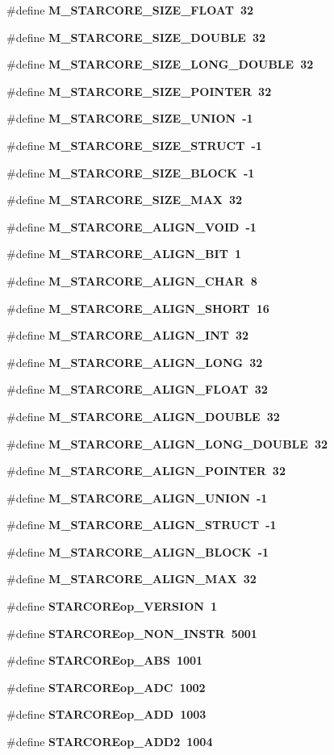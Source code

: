 \begin{CompactItemize}
\#define \bf{M\_\-STARCORE\_\-SIZE\_\-FLOAT}~32
\item 
\#define \bf{M\_\-STARCORE\_\-SIZE\_\-DOUBLE}~32
\item 
\#define \bf{M\_\-STARCORE\_\-SIZE\_\-LONG\_\-DOUBLE}~32
\item 
\#define \bf{M\_\-STARCORE\_\-SIZE\_\-POINTER}~32
\item 
\#define \bf{M\_\-STARCORE\_\-SIZE\_\-UNION}~-1
\item 
\#define \bf{M\_\-STARCORE\_\-SIZE\_\-STRUCT}~-1
\item 
\#define \bf{M\_\-STARCORE\_\-SIZE\_\-BLOCK}~-1
\item 
\#define \bf{M\_\-STARCORE\_\-SIZE\_\-MAX}~32
\item 
\#define \bf{M\_\-STARCORE\_\-ALIGN\_\-VOID}~-1
\item 
\#define \bf{M\_\-STARCORE\_\-ALIGN\_\-BIT}~1
\item 
\#define \bf{M\_\-STARCORE\_\-ALIGN\_\-CHAR}~8
\item 
\#define \bf{M\_\-STARCORE\_\-ALIGN\_\-SHORT}~16
\item 
\#define \bf{M\_\-STARCORE\_\-ALIGN\_\-INT}~32
\item 
\#define \bf{M\_\-STARCORE\_\-ALIGN\_\-LONG}~32
\item 
\#define \bf{M\_\-STARCORE\_\-ALIGN\_\-FLOAT}~32
\item 
\#define \bf{M\_\-STARCORE\_\-ALIGN\_\-DOUBLE}~32
\item 
\#define \bf{M\_\-STARCORE\_\-ALIGN\_\-LONG\_\-DOUBLE}~32
\item 
\#define \bf{M\_\-STARCORE\_\-ALIGN\_\-POINTER}~32
\item 
\#define \bf{M\_\-STARCORE\_\-ALIGN\_\-UNION}~-1
\item 
\#define \bf{M\_\-STARCORE\_\-ALIGN\_\-STRUCT}~-1
\item 
\#define \bf{M\_\-STARCORE\_\-ALIGN\_\-BLOCK}~-1
\item 
\#define \bf{M\_\-STARCORE\_\-ALIGN\_\-MAX}~32
\item 
\#define \bf{STARCOREop\_\-VERSION}~1
\item 
\#define \bf{STARCOREop\_\-NON\_\-INSTR}~5001
\item 
\#define \bf{STARCOREop\_\-ABS}~1001
\item 
\#define \bf{STARCOREop\_\-ADC}~1002
\item 
\#define \bf{STARCOREop\_\-ADD}~1003
\item 
\#define \bf{STARCOREop\_\-ADD2}~1004
\item 

\end{CompactItemize}
